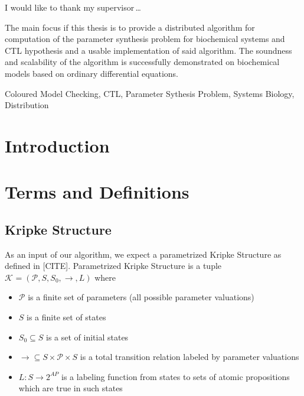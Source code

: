 \documentclass[12pt,oneside,draft]{fithesis2}
\newcommand{\ks}[1][]{\ensuremath{\mathcal{K}_{#1}}}
\newcommand{\fullKs}{\ensuremath{ \ks = (\params, S, S_0, \trans{}, L) }}
\newcommand{\trans}[1]{\stackrel{#1}{\rightarrow}}
\newcommand{\params}{\mathcal{P}}
\begin{document}
  \FrontMatter                    %
    \ThesisTitlePage                %
    \begin{ThesisDeclaration}       %
      \DeclarationText
      \AdvisorName
    \end{ThesisDeclaration}
    \begin{ThesisThanks}            %
      I would like to thank my supervisor\,\dots
    \end{ThesisThanks}
    \begin{ThesisAbstract}          %
      The main focus if this thesis is to provide a distributed algorithm for computation of the parameter synthesis problem for biochemical systems and CTL hypothesis and a usable implementation of said algorithm. The soundness and scalability of the algorithm is successfully demonstrated on biochemical models based on ordinary differential equations. 
    \end{ThesisAbstract}
    \begin{ThesisKeyWords}          %
		Coloured Model Checking, CTL, Parameter Sythesis Problem, Systems Biology, Distribution
    \end{ThesisKeyWords}
    \tableofcontents                %
  
  \MainMatter                     %
    \chapter{Introduction}          %

		
	\chapter{Terms and Definitions}
		
		\section{Kripke Structure}
	
			As an input of our algorithm, we expect a parametrized Kripke Structure as defined in [CITE]. Parametrized Kripke Structure is a tuple $\fullKs$ where
			
			\begin{itemize}
				\item $\params$ is a finite set of parameters (all possible parameter valuations)
				\item $S$ is a finite set of states
				\item $S_0 \subseteq S$ is a set of initial states
				\item $\trans{} \subseteq S \times \params \times S$ is a total transition relation labeled by parameter valuations 
				\item $L: S \rightarrow 2^{AP} $ is a labeling function from states to sets of atomic propositions which are true in such states
			\end{itemize} 		
			
\end{document}
